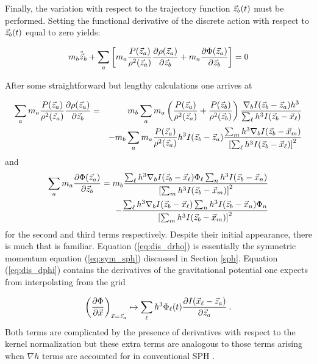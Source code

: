 Finally, the variation with respect to the trajectory function ${\vec z}_b(t)$ must
be performed.  Setting the functional derivative of the discrete action with
respect to ${\vec z}_b(t)$ equal to zero yields:

\begin{eqnarray}\label{eq:dis_particle}
  m_b {\ddot {{\vec z}}}_b + \sum_a \left[ m_a \frac{P({\vec z}_a)}{\rho^2({\vec z}_a)}
                                       \frac{\partial \rho({\vec z}_a)}{\partial {\vec z}_b}
                                 + m_a \frac{\partial {\Phi}({\vec z}_a)}{\partial {\vec z}_b}
                            \right] = 0
\end{eqnarray}

After some straightforward but lengthy calculations one arrives at

\begin{eqnarray}\label{eq:dis_drho}
  \sum_a m_a \frac{P({\vec z}_a)}{\rho^2({\vec z}_a)}
             \frac{\partial \rho({\vec z}_a)}{\partial {\vec z}_b} & = &
    m_b \sum_a m_a
      \left(
        \frac{P({\vec z}_a)}{\rho^2({\vec z}_a)} + \frac{P({\vec z}_b)}{\rho^2({\vec z}_b)}
      \right)
      \frac{ \nabla_b I({\vec z}_b - {\vec z}_a) h^3}{\sum_{\ell} h^3 I({\vec z}_b - {\vec x}_{\ell})}
    \nonumber \\
  & &   -
    m_b \sum_a m_a
      \frac{P({\vec z}_a)}{\rho^2({\vec z}_a)} h^3 I({\vec z}_b - {\vec z}_a)
      \frac{\sum_m h^3 \nabla_b I({\vec z}_b - {\vec x}_m)}
        {\left[ \sum_{\ell} h^3 I( {\vec z}_b - {\vec x}_{\ell}) \right] ^2}
\end{eqnarray}
%
and
%
\begin{eqnarray}\label{eq:dis_dphi}
  \sum_a m_a \frac{\partial {\Phi}({\vec z}_a)}{\partial {\vec z}_b}
       = m_b \frac{ \sum_{\ell} h^3 \nabla_b I ({\vec z}_b - {\vec x}_{\ell}) {\Phi_{\ell}}
             \sum_n h^3 I({\vec z}_b - {\vec x}_n)}{\left[
             \sum_m h^3 I( {\vec z}_b - {\vec x}_m) \right] ^2} \nonumber \\
           - \frac{\sum_{\ell} h^3 \nabla_b I({\vec z}_b - {\vec x}_{\ell})
             \sum_n h^3 I({\vec z}_b - {\vec x}_n) {\Phi}_n}
            {\left[ \sum_m h^3 I( {\vec z}_b - {\vec x}_m) \right] ^2}
\end{eqnarray}
for the second and third terms respectively.  Despite their initial appearance,
there is much that is familiar.  Equation (\ref{eq:dis_drho}) is essentially
the symmetric momentum equation (\ref{eq:sym_sph}) discussed in Section
\ref{sph}.  Equation (\ref{eq:dis_dphi}) contains the derivatives of the
gravitational potential one expects from interpolating from the grid

\begin{equation}\label{eq:gravForce}
    \left( \frac{\partial \Phi}{\partial {\vec x}} \right)_{{\vec x} = {\vec z}_a}
    \mapsto
    \sum_{\ell} h^3  {\Phi_{\ell}}(t)
         \frac{\partial I({{\vec x}_{\ell}} - {{\vec z}_a})}{\partial {\vec z}_a} \: .
\end{equation}
Both terms are complicated by the presence of derivatives with respect to the
kernel normalization but these extra terms are analogous to those terms arising
when $\nabla h$ terms are accounted for in conventional SPH \cite{A:NP94}.

